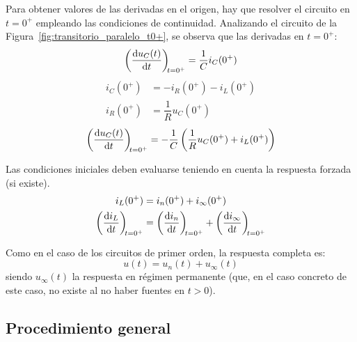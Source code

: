 Para obtener valores de las derivadas en el origen, hay que resolver
el circuito en \(t = 0^+\) empleando las condiciones de
continuidad. Analizando el circuito de la
Figura~\ref{fig:transitorio_paralelo_t0+}, se observa que las
derivadas en $t=0^+$:
\[
  \diff{u_C(t)}{t}[t = 0^+] = \frac{1}{C} i_C(0^+)
\]
\begin{align*}
  i_C(0^+) &= -i_R(0^+) - i_L(0^+)\\
  i_R(0^+) &= \dfrac{1}{R} u_C(0^+)
\end{align*}
\[ {\diff{u_C(t)}{t}[t = 0^+] = - \frac{1}{C}\left(\frac{1}{R}
      u_C(0^+) + i_L(0^+)\right)}
\]
\begin{remark}
  Las condiciones iniciales deben evaluarse teniendo en cuenta la
  respuesta forzada (si existe).
  \begin{align*}
    i_L(0^+) &= i_n(0^+) + i_{\infty}(0^+)\\
    \diff{i_L}{t}[t = 0^+] &= \diff{i_n}{t}[t = 0^+] + \diff{i_{\infty}}{t}[t = 0^+]  
  \end{align*}
\end{remark}
Como en el caso de los circuitos de primer orden, la respuesta
completa es:
\begin{equation*}
  u(t)=u_n(t)+u_\infty(t)
\end{equation*}
siendo $u_\infty(t)$ la respuesta en régimen permanente (que, en el
caso concreto de este caso, no existe al no haber fuentes en $t>0$).
	
\subsection{Procedimiento general}
	
